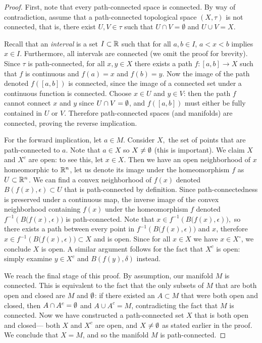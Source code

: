 \begin{proof}
    First, note that every path-connected space is connected. By way of contradiction, assume that a path-connected topological space $(X, \tau)$ is not connected, that is, there exist $U, V \in \tau$ such that $U \cap V = \emptyset$ and  $U \cup V = X.$ 

    Recall that an \textit{interval} is a set $I \subset \mathbb{R}$ such that for all $a, b \in I$, $a < x < b$ implies $x \in I.$ Furthermore, all intervals are connected (we omit the proof for brevity). Since $\tau$ is path-connected, for all $x,y \in X$ there exists a path $f: \left[ a,b \right] \to X$ such that $f$ is continuous and $f(a)=x$ and $f(b)=y.$ Now the image of the path denoted $f( [ a,b ] ) $ is connected, since the image of a connected set under a continuous function is connected. Choose $x \in U$ and $y \in V$: then the path $f$ cannot connect $x$ and $y$ since $U \cap V = \emptyset$, and $f([a,b])$ must either be fully contained in $U$ or $V$. Therefore path-connected spaces (and manifolds) are connected, proving the reverse implication.

    For the forward implication, let $a \in M.$ Consider $X,$ the set of points that are path-connected to $a.$ Note that $a \in X$ so $X \neq \emptyset$ (this is important). We claim $X$ and $X^c$ are open: to see this, let $x \in X.$ Then we have an open neighborhood of $x$ homeomorphic to $\mathbb{R}^n$, let us denote its image under the homeomorphism $f$ as $U \subset \mathbb{R}^n$. We can find a convex neighborhood of $f(x)$ denoted $B(f(x), \epsilon) \subset U$ that is path-connected by definition. Since path-connectedness is preserved under a continuous map, the inverse image of the convex neighborhood containing $f(x)$ under the homeomorphism $f$ denoted $f^{-1}\left( B(f(x), \epsilon \right))$ is path-connected. Note that $x \in f^{-1}\left( B(f(x), \epsilon \right)),$ so there exists a path between every point in $f^{-1}\left( B(f(x), \epsilon \right))$ and $x$, therefore $x \in f^{-1}\left( B(f(x), \epsilon \right)) \subset X$ and is open. Since for all $x \in X$ we have $x \in X^{\circ}$, we conclude $X$ is open. A similar argument follows for the fact that $X^c$ is open: simply examine $y \in X^c$ and $B(f(y), \delta)$ instead.

    We reach the final stage of this proof. By assumption, our manifold $M$ is connected. This is equivalent to the fact that the only subsets of $M$ that are both open and closed are $M$ and $\emptyset$: if there existed an $A \subset M$ that were both open and closed, then $A \cap A^c = \emptyset$ and $A \cup A^c = M$, contradicting the fact that $M$ is connected. Now we have constructed a path-connected set $X$ that is both open and closed— both  $X$ and $X^c$ are open, and $X \neq \emptyset$ as stated earlier in the proof. We conclude that $X = M$, and so the manifold $M$ is path-connected. 
\end{proof}
\vspace{10mm}

